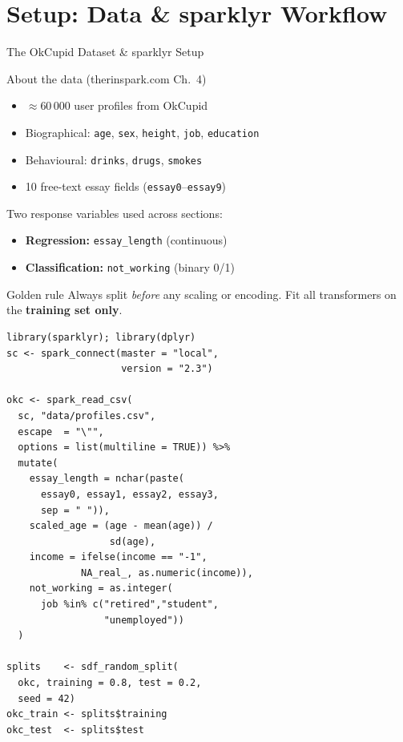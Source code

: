 \documentclass[11pt, aspectratio=169]{beamer}
\begin{document}
\section{Setup: Data \& sparklyr Workflow}

\begin{frame}{The OkCupid Dataset \& sparklyr Setup}
	\begin{block}{About the data (therinspark.com Ch.\ 4)}
				\begin{itemize}
					\item $\approx$60\,000 user profiles from OkCupid
					\item Biographical: \texttt{age}, \texttt{sex}, \texttt{height},
					\texttt{job}, \texttt{education}
					\item Behavioural: \texttt{drinks}, \texttt{drugs}, \texttt{smokes}
					\item 10 free-text essay fields (\texttt{essay0}--\texttt{essay9})
				\end{itemize}
				Two response variables used across sections:
				\begin{itemize}
					\item \textbf{Regression:} \texttt{essay\_length} (continuous)
					\item \textbf{Classification:} \texttt{not\_working} (binary 0/1)
				\end{itemize}
			\end{block}
			\begin{alertblock}{Golden rule}
				Always split \emph{before} any scaling or encoding.
				Fit all transformers on the \textbf{training set only}.
			\end{alertblock}
		\begin{lstlisting}[title={Loading, cleaning \& splitting (therinspark.com §4.1--4.2)}]
library(sparklyr); library(dplyr)
sc <- spark_connect(master = "local",
                    version = "2.3")

okc <- spark_read_csv(
  sc, "data/profiles.csv",
  escape  = "\"",
  options = list(multiline = TRUE)) %>%
  mutate(
    essay_length = nchar(paste(
      essay0, essay1, essay2, essay3,
      sep = " ")),
    scaled_age = (age - mean(age)) /
                  sd(age),
    income = ifelse(income == "-1",
             NA_real_, as.numeric(income)),
    not_working = as.integer(
      job %in% c("retired","student",
                 "unemployed"))
  )

splits    <- sdf_random_split(
  okc, training = 0.8, test = 0.2,
  seed = 42)
okc_train <- splits$training
okc_test  <- splits$test
			\end{lstlisting}
		\end{frame}
\end{document}
